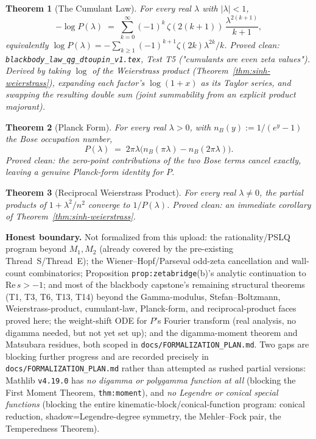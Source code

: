 \documentclass{report}
\newtheorem{theorem}{Theorem}[chapter]
\theoremstyle{definition}
\begin{document}
\begin{theorem}[The Cumulant Law]
  \label{thm:cumulant-law}
  \leanok
  For every real $\lambda$ with $|\lambda|<1$,
  \[
    -\log P(\lambda) \;=\; \sum_{k=0}^{\infty} (-1)^k\,\zeta(2(k+1))\,\frac{\lambda^{2(k+1)}}{k+1},
  \]
  equivalently $\log P(\lambda) = -\sum_{k\ge1}(-1)^{k+1}\zeta(2k)\lambda^{2k}/k$.
  \emph{Proved clean}: \texttt{blackbody\_law\_qg\_dtoupin\_v1.tex}, Test T5 ("cumulants are
  even zeta values"). Derived by taking $\log$ of the Weierstrass product
  (Theorem~\ref{thm:sinh-weierstrass}), expanding each factor's $\log(1+x)$ as its Taylor
  series, and swapping the resulting double sum (joint summability from an explicit product
  majorant).
\end{theorem}

\begin{theorem}[Planck Form]
  \label{thm:planck-form}
  \leanok
  For every real $\lambda > 0$, with $n_B(y) := 1/(e^y-1)$ the Bose occupation number,
  \[
    P(\lambda) \;=\; 2\pi\lambda\bigl(n_B(\pi\lambda) - n_B(2\pi\lambda)\bigr).
  \]
  \emph{Proved clean}: the zero-point contributions of the two Bose terms cancel exactly,
  leaving a genuine Planck-form identity for $P$.
\end{theorem}

\begin{theorem}[Reciprocal Weierstrass Product]
  \label{thm:one-div-p-weierstrass}
  \leanok
  For every real $\lambda \neq 0$, the partial products of $1+\lambda^2/n^2$ converge to
  $1/P(\lambda)$.
  \emph{Proved clean}: an immediate corollary of Theorem~\ref{thm:sinh-weierstrass}.
\end{theorem}

\textbf{Honest boundary.} Not formalized from this upload: the rationality/PSLQ program
beyond $M_1, M_2$ (already covered by the pre-existing Thread~S/Thread~E); the
Wiener--Hopf/Parseval odd-zeta cancellation and wall-count combinatorics; Proposition
\texttt{prop:zetabridge}(b)'s analytic continuation to $\mathrm{Re}\,s>-1$; and most of the
blackbody capstone's remaining structural theorems (T1, T3, T6, T13, T14) beyond the
Gamma-modulus, Stefan--Boltzmann, Weierstrass-product, cumulant-law, Planck-form, and
reciprocal-product faces proved here; the weight-shift ODE for $P$'s Fourier transform
(real analysis, no digamma needed, but not yet set up); and the digamma-moment theorem and
Matsubara residues, both scoped in \texttt{docs/FORMALIZATION\_PLAN.md}.
Two gaps are blocking further progress and are recorded precisely in
\texttt{docs/FORMALIZATION\_PLAN.md} rather than attempted as rushed partial versions:
Mathlib \texttt{v4.19.0} has \emph{no digamma or polygamma function at all} (blocking the
First Moment Theorem, \texttt{thm:moment}), and \emph{no Legendre or conical special
functions} (blocking the entire kinematic-block/conical-function program: conical
reduction, shadow=Legendre-degree symmetry, the Mehler--Fock pair, the Temperedness
Theorem).
\end{document}
